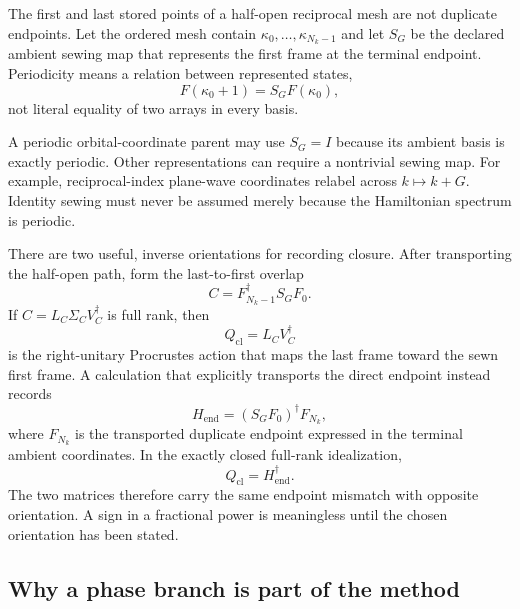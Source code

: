 The first and last stored points of a half-open reciprocal mesh are not duplicate
endpoints.  Let the ordered mesh contain
$\kappa_0,\ldots,\kappa_{N_k-1}$ and let $S_G$ be the declared ambient sewing map
that represents the first frame at the terminal endpoint.  Periodicity means a
relation between represented states,
\begin{equation}
  F(\kappa_0+1)=S_GF(\kappa_0),
  \label{eq:training-composite-sewing-relation}
\end{equation}
not literal equality of two arrays in every basis.

A periodic orbital-coordinate parent may use $S_G=I$ because its ambient basis
is exactly periodic. Other representations can require a nontrivial sewing map.
For example, reciprocal-index plane-wave coordinates relabel across
$k\mapsto k+G$. Identity sewing must never be assumed merely because the
Hamiltonian spectrum is periodic.

There are two useful, inverse orientations for recording closure.  After
transporting the half-open path, form the last-to-first overlap
\begin{equation}
  C=F_{N_k-1}^{\dagger}S_GF_0.
  \label{eq:training-composite-closure-overlap}
\end{equation}
If
$C=L_C\Sigma_CV_C^{\dagger}$ is full rank, then
\begin{equation}
  Q_{\mathrm{cl}}=L_CV_C^{\dagger}
  \label{eq:training-composite-closure-right-action}
\end{equation}
is the right-unitary Procrustes action that maps the last frame toward the sewn
first frame.  A calculation that explicitly transports the direct endpoint
instead records
\begin{equation}
  H_{\mathrm{end}}=(S_GF_0)^{\dagger}F_{N_k},
  \label{eq:training-composite-endpoint-mismatch}
\end{equation}
where $F_{N_k}$ is the transported duplicate endpoint expressed in the
terminal ambient coordinates.  In the exactly closed
full-rank idealization,
\begin{equation}
  Q_{\mathrm{cl}}=H_{\mathrm{end}}^{\dagger}.
  \label{eq:training-composite-closure-orientation-inverse}
\end{equation}
The two matrices therefore carry the same endpoint mismatch with opposite
orientation.  A sign in a fractional power is meaningless until the chosen
orientation has been stated.

\subsection{Why a phase branch is part of the method}


